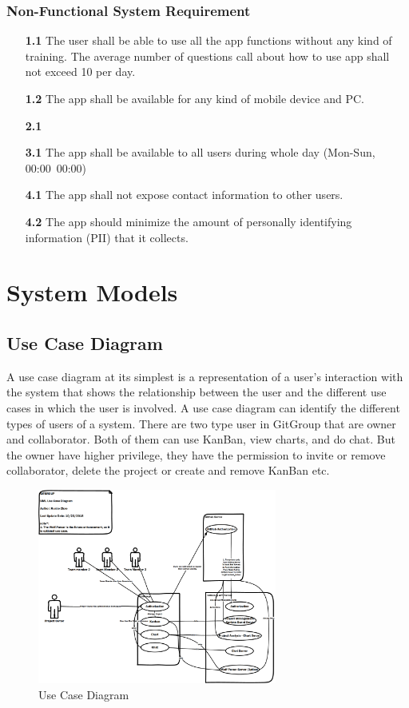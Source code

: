 \documentclass[12pt,a4paper]{report}
\begin{document}
	\subsection{Non-Functional System Requirement}
		\begin{enumerate}
			\item[\textbf{1.1}] The user shall be able to use all the app functions without any kind of training. The average number of questions call about how to use app shall not exceed 10 per day.
			\item[\textbf{1.2}] The app shall be available for any kind of mobile device and PC.
			\item[\textbf{2.1}]
			\item[\textbf{3.1}] The app shall be available to all users during whole day (Mon-Sun, 00:00~00:00)
			\item[\textbf{4.1}] The app shall not expose contact information to other users. 
			\item[\textbf{4.2}] The app should minimize the amount of personally identifying information (PII) that it collects.
		\end{enumerate}
	
\chapter{System Models}
\section{Use Case Diagram}
A use case diagram at its simplest is a representation of a user's interaction with the system that shows the relationship between the user and the different use cases in which the user is involved. A use case diagram can identify the different types of users of a system. There are two type user in GitGroup that are owner and collaborator. Both of them can use KanBan, view charts, and do chat. But the owner have higher privilege, they have the permission to invite or remove collaborator, delete the project or create and remove KanBan etc.
\begin{figure}[H]
	\centering
	\includegraphics[width=0.7\textwidth]{./pics/UseCaseDiagram.png}
	\caption{Use Case Diagram}
\end{figure}
\end{document}
